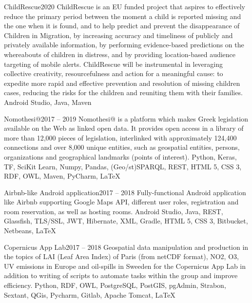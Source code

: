 \begin{projects}
	\project
	{ChildRescue}{2020}
	{}
	{ChildRescue is an EU funded project that aspires to effectively reduce the primary period between the moment a child is reported missing and the one when it is found, and to help predict and prevent the disappearance of Children in Migration, by increasing accuracy and timeliness of publicly and privately available information, by performing evidence-based predictions on the whereabouts of children in distress, and by providing location-based audience targeting of mobile alerts. ChildRescue will be instrumental in leveraging collective creativity, resourcefulness and action for a meaningful cause: to expedite more rapid and effective prevention and resolution of missing children cases, reducing the risks for the children and reuniting them with their families.}
	{Android Studio, Java, Maven}

	\project
	{Nomothesi@}{2017 – 2019}
	{}
	{Nomothesi@ is a platform which makes Greek legislation available on the Web as linked open data. It provides open access in a library of more than 12,000 pieces of legislation, interlinked with approximately 124,400 connections and over 8,000 unique entities, such as geospatial entities, persons, organizations and geographical landmarks (points of interest).}
	{Python, Keras, TF, SciKit Learn, Numpy, Pandas, (Geo/st)SPARQL, REST, HTML 5, CSS 3, RDF, OWL, Maven, PyCharm, \LaTeX}

	\project
	{Airbnb-like Android application}{2017 – 2018}
	{}
	{Fully-functional Android application like Airbnb supporting Google Maps API, different user roles, registration and room reservation, as well as hosting rooms.}
	{Android Studio, Java, REST, Glassfish, TLS/SSL, JWT, Hibernate, XML, Gradle, HTML 5, CSS 3, Bitbucket, Netbeans, \LaTeX}

	\project
	{Copernicus App Lab}{2017 – 2018}
	{}
	{Geospatial data manipulation and production in the topics of LAI (Leaf Area Index) of Paris (from netCDF format), NO2, O3, UV emissions in Europe and oil-spills in Sweeden for the Copernicus App Lab in addition to writing of scripts to automate tasks within the group and improve efficiency.}
	{Python, RDF, OWL, PostgreSQL, PostGIS, pgAdmin, Strabon, Sextant, QGis, Pycharm, Gitlab, Apache Tomcat, \LaTeX}


\end{projects}
